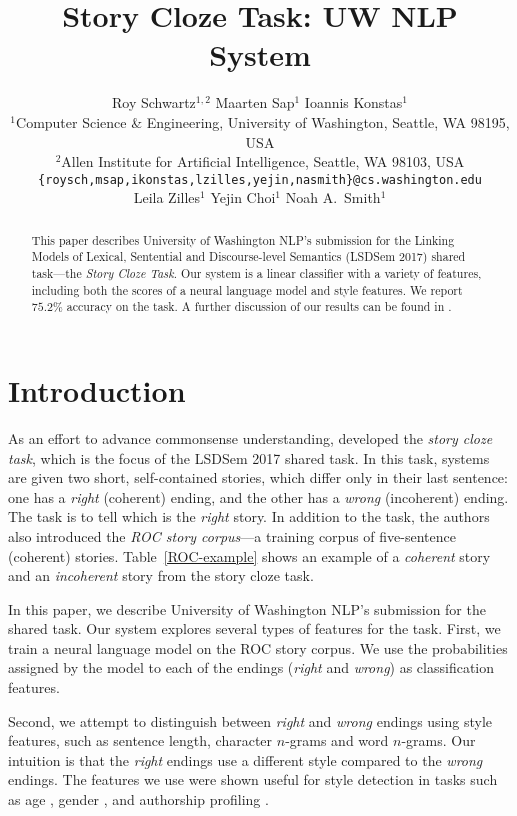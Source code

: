 \documentclass[11pt]{article}
\title{Story Cloze Task: UW NLP System}
\author{\hspace{2cm}Roy Schwartz$^{1,2}$ \And \hspace{2.5cm}Maarten Sap$^1$ \And \hspace{3cm}Ioannis Konstas$^1$ \And \\
  $^1$Computer Science \& Engineering, University of Washington,
  Seattle, WA 98195, USA \\
  $^2$Allen Institute for Artificial Intelligence, Seattle, WA 98103, USA \\
    {\tt \{roysch,msap,ikonstas,lzilles,yejin,nasmith\}@cs.washington.edu}  \\
    \And \hspace{-2cm}Leila Zilles$^1$ \And \hspace{-2.5cm}Yejin Choi$^1$ \And \hspace{-2.5cm}Noah A.~Smith$^1$ \\
  }
\date{}
\newcommand{\ms}[1]{{\color{cyan}\{\textit{#1}\}$_{ms}$}}
\newcommand{\tabref}[1]{Table~\ref{#1}}
\begin{document}
\maketitle
\begin{abstract} %
This paper describes University of Washington NLP's submission for the Linking Models of Lexical, Sentential and Discourse-level Semantics (LSDSem 2017) shared task---the \textit{Story Cloze Task}.
Our system is a linear classifier with a variety of features, including both the scores of a neural language model and style features.
We report  $75.2\%$ accuracy on the task. 
A further discussion of our results can be found in .
\end{abstract}

\section{Introduction}
As an effort to advance commonsense  understanding,  developed the \textit{story cloze task}, which is the focus of the LSDSem 2017 shared task. 
In this task, systems are given two short, self-contained stories, which differ only in their last sentence: 
one has a {\it right} (coherent) ending, and the other has a {\it wrong} (incoherent) ending.
The task is to tell which is the {\it right} story.
In addition to the task, the authors also introduced the {\it ROC story corpus}---a training corpus of five-sentence (coherent) stories. 
\tabref{ROC-example} shows an example of a {\it coherent} story and an {\it incoherent} story from the story cloze task.


In this paper, we describe University of Washington NLP's submission for the shared task.
Our system explores several types of features for the task.
First, we train a neural language model \cite{mikolov2010recurrent} on the ROC story corpus. 
We use the probabilities assigned by the model to each of the endings ({\it right} and {\it wrong}) as classification features.

Second, we attempt to distinguish between {\it right} and {\it wrong} endings using style features, such as sentence length, character $n$-grams and word $n$-grams. 
Our intuition is that the {\it right} endings use a different style compared to the {\it wrong} endings.
The features we use were shown useful for style detection in tasks such as age \cite{Schler:2006}, gender \cite{Argamon:2003}, 
and authorship profiling \cite{Stamatatos:2009}.
\end{document}
